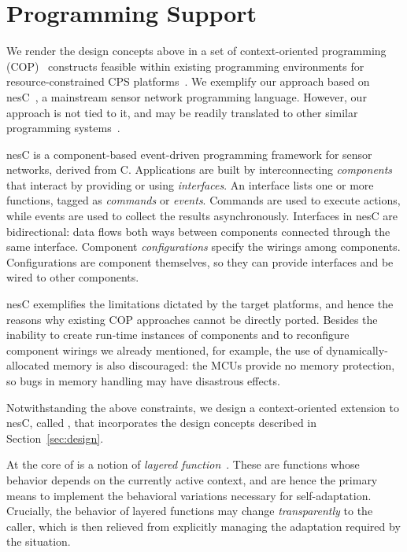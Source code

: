 
\section{Programming Support}
\label{sec:conesc}

We render the design concepts above in a set of context-oriented
programming (COP)~\cite{Hirschfeld08} constructs feasible within
existing programming environments for resource-constrained CPS
platforms~\cite{mottola10:survey}.  We exemplify our approach based on
nesC~\cite{gay03nesc}, a mainstream sensor network programming
language. However, our approach is not tied to it, and may be readily
translated to other similar programming systems~\cite{mottola10:survey}.

 nesC is a component-based event-driven
programming framework for sensor networks, derived from
C. Applications are built by interconnecting \emph{components} that
interact by providing or using \emph{interfaces}. An interface lists
one or more functions, tagged as \emph{commands} or
\emph{events}. Commands are used to execute actions, while events are
used to collect the results asynchronously.  Interfaces in nesC are
bidirectional: data flows both ways between components connected
through the same interface.  Component \emph{configurations} specify
the wirings among components. Configurations are component themselves,
so they can provide interfaces and be wired to other components.

nesC exemplifies the limitations dictated by the target platforms, and
hence the reasons why existing COP approaches cannot be directly
ported. Besides the inability to create run-time instances of
components and to reconfigure component wirings we already mentioned,
for example, the use of dynamically-allocated memory is also
discouraged: the MCUs provide no memory protection, so bugs in memory
handling may have disastrous effects.

\fakepar{\conesc} Notwithstanding the above constraints, we design a
context-oriented extension to nesC, called \conesc, that incorporates
the design concepts described in Section~\ref{sec:design}. 

At the core of \conesc is a notion of \emph{layered
  function}~\cite{Hirschfeld08}. These are functions whose behavior
depends on the currently active context, and are hence the primary
means to implement the behavioral variations necessary for
self-adaptation. Crucially, the behavior of layered functions may
change \emph{transparently} to the caller, which is then relieved from
explicitly managing the adaptation required by the situation.


